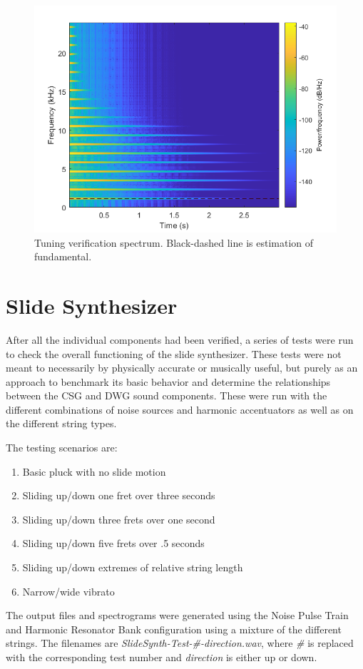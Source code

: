 \documentclass[../main.tex]{subfiles}
\begin{document}
\begin{figure}[h]
    \centering
    \includegraphics[scale=.65]{./images/plots/StringDWGInterpSpec.png}
    \caption{Tuning verification spectrum. Black-dashed line is estimation of fundamental.}
    \label{fig:DWGInterpSpec}
\end{figure}

\clearpage

\section{Slide Synthesizer}
After all the individual components had been verified, a series of tests were run to check the overall functioning of the slide synthesizer. These tests were not meant to necessarily by physically accurate or musically useful, but purely as an approach to benchmark its basic behavior and determine the relationships between the CSG and DWG sound components. These were run with the different combinations of noise sources and harmonic accentuators as well as on the different string types. 

The testing scenarios are:
\begin{enumerate}
    \item Basic pluck with no slide motion
    \item Sliding up/down one fret over three seconds
    \item Sliding up/down three frets over one second
    \item Sliding up/down five frets over .5 seconds
    \item Sliding up/down extremes of relative string length
    \item Narrow/wide vibrato
\end{enumerate}
The output files and spectrograms were generated using the Noise Pulse Train and Harmonic Resonator Bank configuration using a mixture of the different strings. The filenames are \emph{SlideSynth-Test-\#-direction.wav}, where \emph{\#} is replaced with the corresponding test number and \emph{direction} is either up or down.
\end{document}
